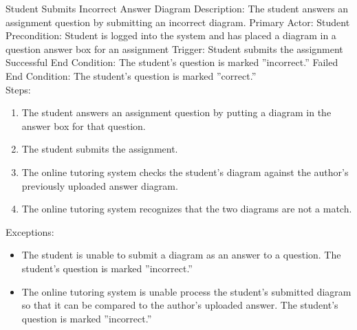     \begin{section}{Student Submits Incorrect Answer Diagram}
        Description: The student answers an assignment question by submitting an incorrect diagram.
        Primary Actor: Student
        Precondition: Student is logged into the system and has placed a diagram in a question answer box for an assignment  
        Trigger: Student submits the assignment
        Successful End Condition: The student's question is marked ''incorrect.''
        Failed End Condition: The student's question is marked ''correct.''\\
        Steps:
        \begin{enumerate}
            \item{The student answers an assignment question by putting a diagram in the answer box for that question.}
            \item{The student submits the assignment.}
            \item{The online tutoring system checks the student's diagram against the author's previously uploaded answer diagram.}
            \item{The online tutoring system recognizes that the two diagrams are not a match.} 
        \end{enumerate}
        Exceptions:
        \begin{itemize}
            \item{The student is unable to submit a diagram as an answer to a question.  The student's question is marked ''incorrect.''}  
            \item{The online tutoring system is unable process the student's submitted diagram so that it 
            can be compared to the author's uploaded answer.  The student's question is marked ''incorrect.''}
        \end{itemize}
    \end{section}




